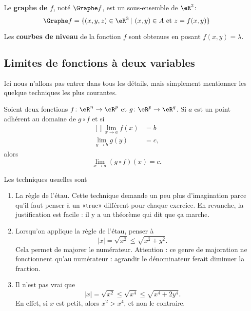 Le \textbf{graphe de $f$}, noté $\Graphe f$, est un sous-ensemble de $\eR^3$:\[\Graphe f = \{(x,y,z) \in \eR^3 \mid (x,y) \in A \text{ et } z = f(x,y)\}\]

Les \textbf{courbes de niveau} de la fonction $f$ sont obtenues en posant $f(x,y)=\lambda$.

\subsection{Limites de fonctions à deux variables}

Ici nous n'allons pas entrer dans tous les détails, mais simplement mentionner les quelque techniques les plus courantes. 

\begin{theorem}		\label{ThoLimiteCompose}
	Soient deux fonctions $f\colon \eR^n\to \eR^p$ et $g\colon \eR^p\to \eR^q$. Si $a$ est un point adhérent au domaine de $g\circ f$ et si
	\begin{equation}
		\begin{aligned}[]
			\lim_{x\to a}f(x)&=b\\
			\lim_{y\to b}g(y)&=c,
		\end{aligned}
	\end{equation}
	alors 
	\begin{equation}
		\lim_{x\to a}(g\circ f)(x)=c.
	\end{equation}
\end{theorem}

Les techniques usuelles sont
\begin{enumerate}

	\item
		La règle de l'étau. Cette technique demande un peu plus d'imagination parce qu'il faut penser à un «truc» différent pour chaque exercice. En revanche, la justification est facile : il y a un théorème qui dit que ça marche.

	\item
		Lorsqu'on applique la règle de l'étau, penser à
		\begin{equation}
			| x |=\sqrt{x^2}\leq\sqrt{x^2+y^2}.
		\end{equation}
		Cela permet de majorer le numérateur. Attention : ce genre de majoration ne fonctionnent qu'au numérateur : agrandir le dénominateur ferait diminuer la fraction.

	\item
		Il n'est pas vrai que
		\begin{equation}
			| x |=\sqrt{x^2}\leq\sqrt{x^4}\leq\sqrt{x^4+2y^4}.
		\end{equation}
		En effet, si $x$ est petit, alors $x^2>x^4$, et non le contraire.

\end{enumerate}

